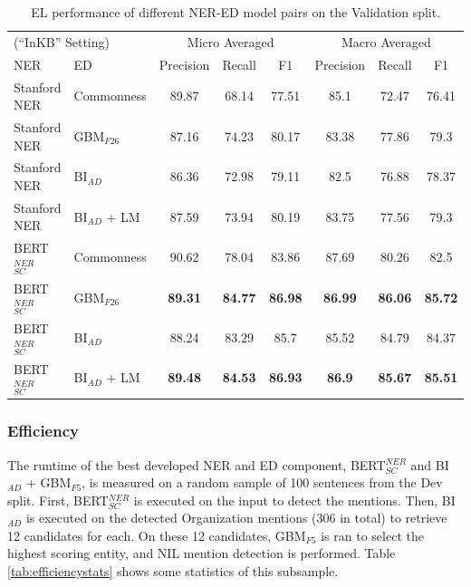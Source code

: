 \documentclass{report}
\theoremstyle{definition}
\theoremstyle{remark}
\begin{document}
\begin{table}[H]
    \vspace{0.5cm}\begin{tabular}{l l c c c| c c c}
    \multicolumn{2}{l}{(``InKB'' Setting)}&\multicolumn{3}{c|}{Micro Averaged}&\multicolumn{3}{c}{Macro Averaged} \\
    NER & ED &Precision&Recall&F1&Precision&Recall&F1\\
    \hline
    Stanford NER& Commonness & 89.87	&68.14&	77.51&	85.1	&72.47&	76.41\\
    Stanford NER& GBM$_{F26}$ & 87.16	&74.23&	80.17	&83.38	&77.86&	79.3\\
    Stanford NER & BI$_{AD}$ &86.36	&72.98&	79.11&	82.5	&76.88&	78.37\\
    Stanford NER &BI$_{AD}$ + LM &87.59&73.94&80.19&83.75&77.56&79.3\\ 
    BERT$_{SC}^{NER}$ & Commonness & 90.62	&78.04&	83.86	&87.69	&80.26&	82.5\\
    BERT$_{SC}^{NER}$ & GBM$_{F26}$ & \textbf{89.31}	&\textcolor{ao}{\textbf{84.77}}&	\textcolor{ao}{\textbf{86.98}}	&\textcolor{ao}{\textbf{86.99}}	&\textcolor{ao}{\textbf{86.06}}&	\textcolor{ao}{\textbf{85.72}}\\
    BERT$_{SC}^{NER}$ & BI$_{AD}$ &88.24	&83.29&	85.7	&85.52	&84.79&	84.37\\
    BERT$_{SC}^{NER}$ & BI$_{AD}$ + LM &\textcolor{ao}{\textbf{89.48}}&\textbf{84.53}&\textbf{86.93}&\textbf{86.9}&\textbf{85.67}&\textbf{85.51}\\
    \end{tabular}
    \caption{EL performance of different NER-ED model pairs on the Validation split. }
    \label{tab:elresultsvalid}
\end{table}


\subsubsection{Efficiency}
The runtime of the best developed NER and ED component, BERT$_{SC}^{NER}$ and  BI$_{AD}$ + GBM$_{F5}$, is measured on a random sample of 100 sentences from the Dev split. First, BERT$_{SC}^{NER}$ is executed on the input to detect the mentions. Then, BI$_{AD}$ is executed on the detected Organization mentions (306 in total) to retrieve 12 candidates for each. On these 12 candidates, GBM$_{F5}$ is ran to select the highest scoring entity, and NIL mention detection is performed. Table \ref{tab:efficiencystats} shows some statistics of this subsample. 
\end{document}
